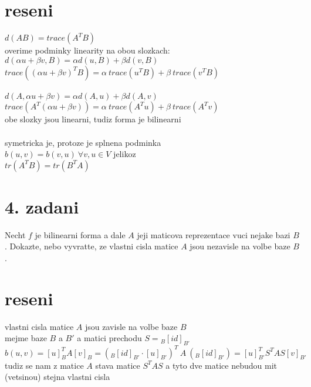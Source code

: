 \documentclass[a4paper]{article}
\begin{document}
\section*{reseni}
$d(AB)=trace(A^TB)$\\
overime podminky linearity na obou slozkach:\\
$d(\alpha u + \beta v, B) = \alpha d(u,B) + \beta d(v,B)$\\
$trace((\alpha u + \beta v)^T B) = \alpha~trace(u^TB) + \beta~trace(v^TB)$\\
\\
$d(A, \alpha u + \beta v) = \alpha d(A,u) + \beta d(A,v)$\\
$trace(A^T(\alpha u + \beta v)) = \alpha~trace(A^Tu) + \beta~trace(A^Tv)$\\
obe slozky jsou linearni, tudiz forma je bilinearni\\
\\
symetricka je, protoze je splnena podminka\\
$b(u,v) = b(v,u)~\forall v,u \in V$ jelikoz\\
$tr(A^TB) = tr(B^TA)$















\section*{4. zadani}
Necht $f$ je bilinearni forma a dale $A$ jeji maticova reprezentace vuci nejake bazi
$B$. Dokazte, nebo vyvratte,
ze vlastni cisla matice $A$ jsou nezavisle na volbe baze $B$.


\section*{reseni}
vlastni cisla matice $A$ jsou zavisle na volbe baze $B$\\
mejme baze $B$ a $B'$ a matici prechodu $S={}_B[id]_{B'}$\\
$b(u,v) =
[u]^T_BA[v]_B =
({}_B[id]_{B'} \cdot [u]_{B'})^T~A~({}_B[id]_{B'})=
[u]^T_{B'}S^TAS[v]_{B'}
$\\
tudiz se nam z matice $A$ stava matice $S^TAS$ a tyto dve matice
nebudou mit (vetsinou) stejna vlastni cisla
\end{document}
